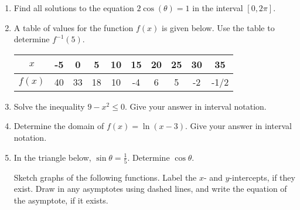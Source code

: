 \documentclass[12pt]{article}
\begin{document}
\begin{enumerate}
\quad \hfill \underline{\hspace{2in}}
\vfill


\item Find all solutions to the equation $2\cos (\theta) = 1$ in the interval $[0, 2 \pi].$\\


\quad \hfill \underline{\hspace{2in}}
\vfill


\item A table of values for the function $f(x)$ is given below. Use the table to determine $f^{-1}(5).$

\begin{tabular}{|c||c|c|c|c|c|c|c|c|c|}
$x$&-5&0&5&10&15&20&25&30&35\\
\hline
$f(x)$&40&33&18&10&-4&6&5&-2&-1/2\\
\end{tabular}

\quad \hfill \underline{\hspace{2in}}
\vspace{.2in}

\item Solve the inequality $9-x^2\leq 0.$ Give your answer in interval notation.\\
\quad

\quad \hfill \underline{\hspace{2in}}
\vfill


\item Determine the domain of $f(x)=\ln(x-3).$ Give your answer in interval notation.\\
\quad

\quad \hfill \underline{\hspace{2in}}
\vfill


 \item In the triangle below, $\sin \theta = \frac{1}{5}.$ Determine $\cos \theta.$ \hfill \underline{\hspace{2in}}\\ 
 
\newpage
Sketch graphs of the following functions. Label the $x$- and $y$-intercepts, if they exist. Draw in any asymptotes using dashed lines, and write the equation of the asymptote, if it exists.
\begin{multicols}{2}{
      \vspace*{-0.45in}

}
\end{multicols}
\end{enumerate}
\end{document}
